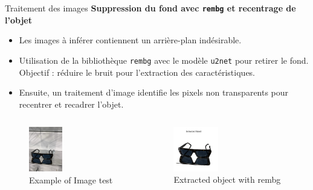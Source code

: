 \documentclass{beamer}
\begin{document}
\begin{frame}{Traitement des images}
    \footnotesize
    \textbf{Suppression du fond avec \texttt{rembg} et recentrage de l'objet}
    \begin{itemize}
        \item Les images à inférer contiennent un arrière-plan indésirable.
        \item Utilisation de la bibliothèque \texttt{rembg} avec le modèle \texttt{u2net} pour retirer le fond. Objectif : réduire le bruit pour l'extraction des caractéristiques. 
        \item Ensuite, un traitement d’image identifie les pixels non transparents pour recentrer et recadrer l’objet.
    \end{itemize}
    \begin{columns}
        \begin{figure}
            \includegraphics[width=0.4\textwidth]{assets/IMG_6883.jpg}
            \caption{Example of Image test}
        \end{figure}
        \begin{figure}
            \includegraphics[width=0.4\textwidth]{assets/glasses_rembg.png}
            \caption{Extracted object with rembg}
        \end{figure}
    \end{columns}
\end{frame}
\end{document}
